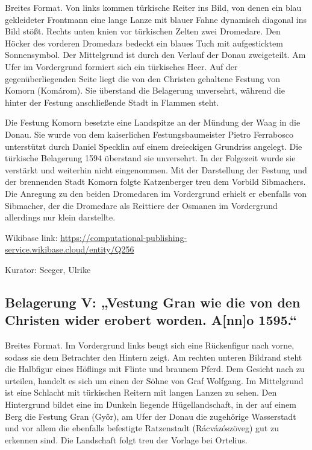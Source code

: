 \documentclass[
  letterpaper,
]{book}
\begin{document}
Breites Format. Von links kommen türkische Reiter ins Bild, von denen
ein blau gekleideter Frontmann eine lange Lanze mit blauer Fahne
dynamisch diagonal ins Bild stößt. Rechts unten knien vor türkischen
Zelten zwei Dromedare. Den Höcker des vorderen Dromedars bedeckt ein
blaues Tuch mit aufgesticktem Sonnensymbol. Der Mittelgrund ist durch
den Verlauf der Donau zweigeteilt. Am Ufer im Vordergrund formiert sich
ein türkisches Heer. Auf der gegenüberliegenden Seite liegt die von den
Christen gehaltene Festung von Komorn (Komárom). Sie überstand die
Belagerung unversehrt, während die hinter der Festung anschließende
Stadt in Flammen steht.

Die Festung Komorn besetzte eine Landspitze an der Mündung der Waag in
die Donau. Sie wurde von dem kaiserlichen Festungsbaumeister Pietro
Ferrabosco unterstützt durch Daniel Specklin auf einem dreieckigen
Grundriss angelegt. Die türkische Belagerung 1594 überstand sie
unversehrt. In der Folgezeit wurde sie verstärkt und weiterhin nicht
eingenommen. Mit der Darstellung der Festung und der brennenden Stadt
Komorn folgte Katzenberger treu dem Vorbild Sibmachers. Die Anregung zu
den beiden Dromedaren im Vordergrund erhielt er ebenfalls von Sibmacher,
der die Dromedare als Reittiere der Osmanen im Vordergrund allerdings
nur klein darstellte.

Wikibase link:
\url{https://computational-publishing-service.wikibase.cloud/entity/Q256}

Kurator: Seeger, Ulrike

\subsection{Belagerung V: „Vestung Gran wie die von den Christen wider
erobert worden. A{[}nn{]}o
1595.``}\label{belagerung-v-vestung-gran-wie-die-von-den-christen-wider-erobert-worden.-anno-1595.}

Breites Format. Im Vordergrund links beugt sich eine Rückenfigur nach
vorne, sodass sie dem Betrachter den Hintern zeigt. Am rechten unteren
Bildrand steht die Halbfigur eines Höflings mit Flinte und braunem
Pferd. Dem Gesicht nach zu urteilen, handelt es sich um einen der Söhne
von Graf Wolfgang. Im Mittelgrund ist eine Schlacht mit türkischen
Reitern mit langen Lanzen zu sehen. Den Hintergrund bildet eine im
Dunkeln liegende Hügellandschaft, in der auf einem Berg die Festung Gran
(Győr), am Ufer der Donau die zugehörige Wasserstadt und vor allem die
ebenfalls befestigte Ratzenstadt (Rácvázószöveg) gut zu erkennen sind.
Die Landschaft folgt treu der Vorlage bei Ortelius.
\end{document}
